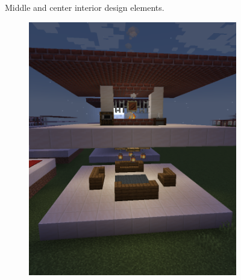 \documentclass[
oneside,
fontsize=11pt
]{scrartcl}
\begin{document}
\begin{figure}[ht]
\begin{subfigure}[t]{0.3\textwidth}
  \end{subfigure}
  
  \caption{Middle and center interior design elements.}
  \label{fig_interior_design_middle_center}
\end{figure}

\begin{figure}[ht]
  \centering
  \begin{subfigure}[t]{0.3\textwidth}
    \includegraphics[width=\textwidth]{images/interior/center-roofhouse.png}
  \end{subfigure}
  \hfill
  \begin{subfigure}[t]{0.3\textwidth}

\end{subfigure}
\end{figure}
\end{document}
